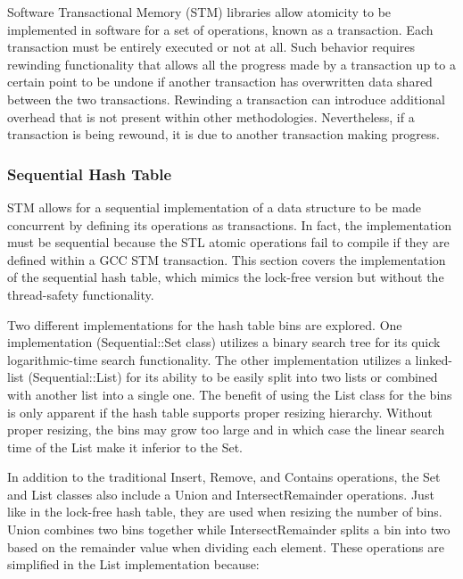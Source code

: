 \documentclass[11pt]{article} %
\begin{document}
Software Transactional Memory (STM) libraries allow atomicity to be implemented in software for a set of operations, known as a transaction. Each transaction must be entirely executed or not at all. Such behavior requires rewinding functionality that allows all the progress made by a transaction up to a certain point to be undone if another transaction has overwritten data shared between the two transactions. Rewinding a transaction can introduce additional overhead that is not present within other methodologies. Nevertheless, if a transaction is being rewound, it is due to another transaction making progress.

\subsubsection{Sequential Hash Table}

STM allows for a sequential implementation of a data structure to be made concurrent by defining its operations as transactions. In fact, the implementation must be sequential because the STL atomic operations fail to compile if they are defined within a GCC STM transaction. This section covers the implementation of the sequential hash table, which mimics the lock-free version but without the thread-safety functionality.

Two different implementations for the hash table bins are explored. One implementation (Sequential::Set class) utilizes a binary search tree for its quick logarithmic-time search functionality. The other implementation utilizes a linked-list (Sequential::List) for its ability to be easily split into two lists or combined with another list into a single one. The benefit of using the List class for the bins is only apparent if the hash table supports proper resizing hierarchy. Without proper resizing, the bins may grow too large and in which case the linear search time of the List make it inferior to the Set.

In addition to the traditional Insert, Remove, and Contains operations, the Set and List classes also include a Union and IntersectRemainder operations. Just like in the lock-free hash table, they are used when resizing the number of bins. Union combines two bins together while IntersectRemainder splits a bin into two based on the remainder value when dividing each element. These operations are simplified in the List implementation because:
\end{document}
